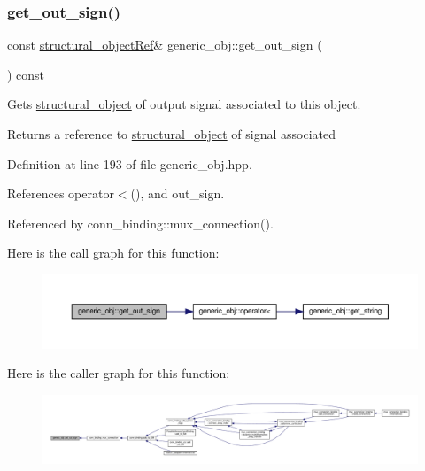 \subsubsection{\texorpdfstring{get\+\_\+out\+\_\+sign()}{get\_out\_sign()}}
{\footnotesize\ttfamily const \hyperlink{structural__objects_8hpp_a8ea5f8cc50ab8f4c31e2751074ff60b2}{structural\+\_\+object\+Ref}\& generic\+\_\+obj\+::get\+\_\+out\+\_\+sign (\begin{DoxyParamCaption}{ }\end{DoxyParamCaption}) const\hspace{0.3cm}{\ttfamily [inline]}}



Gets \hyperlink{classstructural__object}{structural\+\_\+object} of output signal associated to this object. 

\begin{DoxyReturn}{Returns}
a reference to \hyperlink{classstructural__object}{structural\+\_\+object} of signal associated 
\end{DoxyReturn}


Definition at line 193 of file generic\+\_\+obj.\+hpp.



References operator$<$(), and out\+\_\+sign.



Referenced by conn\+\_\+binding\+::mux\+\_\+connection().

Here is the call graph for this function\+:
\nopagebreak
\begin{figure}[H]
\begin{center}
\leavevmode
\includegraphics[width=350pt]{d1/d64/classgeneric__obj_afd9c00bb476ce032d39f6df069184304_cgraph}
\end{center}
\end{figure}
Here is the caller graph for this function\+:
\nopagebreak
\begin{figure}[H]
\begin{center}
\leavevmode
\includegraphics[width=350pt]{d1/d64/classgeneric__obj_afd9c00bb476ce032d39f6df069184304_icgraph}
\end{center}
\end{figure}
\mbox{\label{classgeneric__obj_a9e77dcf1f30df84e3bbfbfa1e274a649}} 
